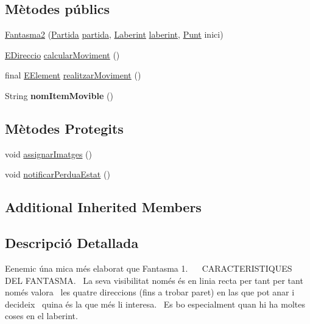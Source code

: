 \subsection*{Mètodes públics}
\begin{DoxyCompactItemize}
\item 
\hyperlink{classlogica_1_1_fantasma2_a0c387e2b93f51714ae84d162fdf05ef0}{Fantasma2} (\hyperlink{classlogica_1_1_partida}{Partida} \hyperlink{classlogica_1_1_item_movible_ace55b4918a7f671f89ed3109c91359e4}{partida}, \hyperlink{classlogica_1_1laberints_1_1_laberint}{Laberint} \hyperlink{classlogica_1_1_item_movible_a97036130b7376d77776427ca126f6fb5}{laberint}, \hyperlink{classlogica_1_1_punt}{Punt} inici)
\item 
\hyperlink{enumlogica_1_1enumeracions_1_1_e_direccio}{E\+Direccio} \hyperlink{classlogica_1_1_fantasma2_a0ea5a98c11778bc3b09f66ea5c7a1db1}{calcular\+Moviment} ()
\item 
final \hyperlink{enumlogica_1_1enumeracions_1_1_e_element}{E\+Element} \hyperlink{classlogica_1_1_fantasma2_a68af5e9cfac40d91de9bf24fc8042ce1}{realitzar\+Moviment} ()
\item 
\hypertarget{classlogica_1_1_fantasma2_a07a2087fbf3959176a4d4b9b81caf660}{String {\bfseries nom\+Item\+Movible} ()}\label{classlogica_1_1_fantasma2_a07a2087fbf3959176a4d4b9b81caf660}

\end{DoxyCompactItemize}
\subsection*{Mètodes Protegits}
\begin{DoxyCompactItemize}
\item 
void \hyperlink{classlogica_1_1_fantasma2_a5ba4c0f99f09122c393203c474fe5562}{assignar\+Imatges} ()
\item 
void \hyperlink{classlogica_1_1_fantasma2_a7a334328a30cc606d6b995904fffb3c7}{notificar\+Perdua\+Estat} ()
\end{DoxyCompactItemize}
\subsection*{Additional Inherited Members}


\subsection{Descripció Detallada}
Eenemic úna mica més elaborat que Fantasma 1.~\newline
~\newline
C\+A\+R\+A\+C\+T\+E\+R\+I\+S\+T\+I\+Q\+U\+E\+S D\+E\+L F\+A\+N\+T\+A\+S\+M\+A.~\newline
La seva visibilitat només és en linia recta per tant per tant només valora~\newline
les quatre direccions (fins a trobar paret) en las que pot anar i decideix~\newline
quina és la que més li interesa.~\newline
Es bo especialment quan hi ha moltes coses en el laberint. 

